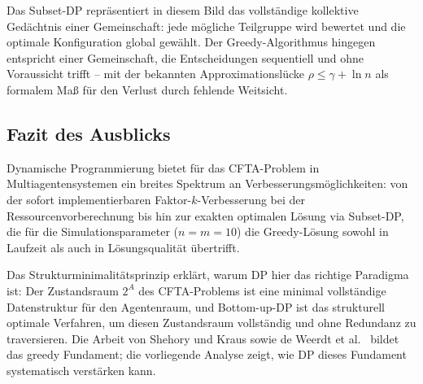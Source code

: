 \documentclass[a4paper,12pt]{article}
\theoremstyle{definition}
\begin{document}
Das Subset-DP repr\"{a}sentiert in diesem Bild das vollst\"{a}ndige kollektive
Ged\"{a}chtnis einer Gemeinschaft: jede m\"{o}gliche Teilgruppe wird bewertet
und die optimale Konfiguration global gew\"{a}hlt. Der Greedy-Algorithmus
hingegen entspricht einer Gemeinschaft, die Entscheidungen sequentiell und
ohne Voraussicht trifft -- mit der bekannten Approximationsl\"{u}cke
$\rho \leq \gamma + \ln n$ als formalem Ma{\ss} f\"{u}r den Verlust durch fehlende
Weitsicht.

\subsection{Fazit des Ausblicks}

Dynamische Programmierung bietet f\"{u}r das CFTA-Problem in Multiagentensystemen
ein breites Spektrum an Verbesserungsm\"{o}glichkeiten: von der sofort
implementierbaren Faktor-$k$-Verbesserung bei der Ressourcenvorberechnung bis
hin zur exakten optimalen L\"{o}sung via Subset-DP, die f\"{u}r die
Simulationsparameter ($n = m = 10$) die Greedy-L\"{o}sung sowohl in Laufzeit
als auch in L\"{o}sungsqualit\"{a}t \"{u}bertrifft.

Das Strukturminimalit\"{a}tsprinzip \cite{epp2026struktur} erkl\"{a}rt, warum DP
hier das richtige Paradigma ist: Der Zustandsraum $2^A$ des CFTA-Problems ist
eine minimal vollst\"{a}ndige Datenstruktur f\"{u}r den Agentenraum, und
Bottom-up-DP ist das strukturell optimale Verfahren, um diesen Zustandsraum
vollst\"{a}ndig und ohne Redundanz zu traversieren. Die Arbeit von Shehory und
Kraus \cite{sk98} sowie de Weerdt et al.\ \cite{dwzk07} bildet das greedy
Fundament; die vorliegende Analyse zeigt, wie DP dieses Fundament systematisch
verst\"{a}rken kann.
\end{document}
